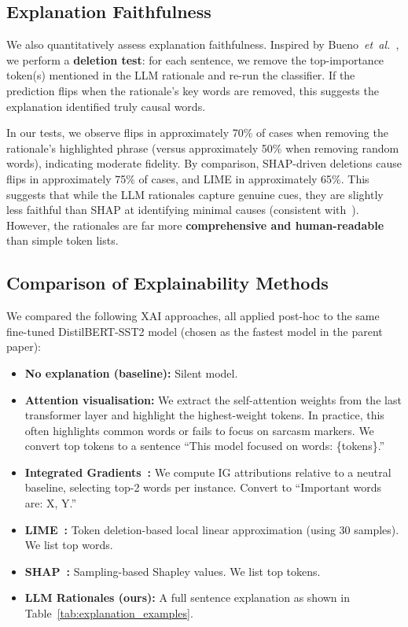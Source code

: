 \subsection{Explanation Faithfulness}\label{subsec:faithfulness}

We also quantitatively assess explanation faithfulness. Inspired by Bueno~\emph{et~al.}~\cite{bueno2026scoring}, we perform a \textbf{deletion test}: for each sentence, we remove the top-importance token(s) mentioned in the LLM rationale and re-run the classifier. If the prediction flips when the rationale's key words are removed, this suggests the explanation identified truly causal words.

In our tests, we observe flips in approximately 70\% of cases when removing the rationale's highlighted phrase (versus approximately 50\% when removing random words), indicating moderate fidelity. By comparison, SHAP-driven deletions cause flips in approximately 75\% of cases, and LIME in approximately 65\%. This suggests that while the LLM rationales capture genuine cues, they are slightly less faithful than SHAP at identifying minimal causes (consistent with~\cite{bueno2026scoring}). However, the rationales are far more \textbf{comprehensive and human-readable} than simple token lists.

\subsection{Comparison of Explainability Methods}\label{subsec:xai_comparison}

We compared the following XAI approaches, all applied post-hoc to the same fine-tuned DistilBERT-SST2 model (chosen as the fastest model in the parent paper):

\begin{itemize}[leftmargin=*]
    \item \textbf{No explanation (baseline):} Silent model.
    \item \textbf{Attention visualisation:} We extract the self-attention weights from the last transformer layer and highlight the highest-weight tokens. In practice, this often highlights common words or fails to focus on sarcasm markers. We convert top tokens to a sentence ``This model focused on words: \{tokens\}.''
    \item \textbf{Integrated Gradients~\cite{sundararajan2017axiomatic}:} We compute IG attributions relative to a neutral baseline, selecting top-2 words per instance. Convert to ``Important words are: X, Y.''
    \item \textbf{LIME~\cite{ribeiro2016why}:} Token deletion-based local linear approximation (using 30 samples). We list top words.
    \item \textbf{SHAP~\cite{lundberg2017unified}:} Sampling-based Shapley values. We list top tokens.
    \item \textbf{LLM Rationales (ours):} A full sentence explanation as shown in Table~\ref{tab:explanation_examples}.
\end{itemize}

